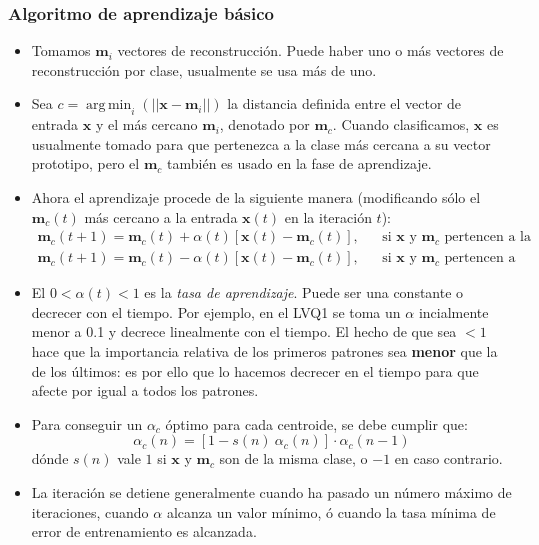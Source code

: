 \documentclass[10pt,a4paper]{article}
\DeclareMathOperator*{\argmin}{arg\,\min}
\begin{document}
\subsubsection{Algoritmo de aprendizaje básico}
\begin{itemize}
\item Tomamos $\mathbf{m}_i$ vectores de reconstrucción. Puede haber uno o más vectores  de reconstrucción por clase, usualmente se usa más de uno.
\item Sea $c = \argmin_i (||\mathbf{x} - \mathbf{m}_i||)$ la distancia definida entre el vector de entrada $\mathbf{x}$ y el más cercano $\mathbf{m}_i$, denotado por $\mathbf{m}_c$. Cuando clasificamos, $\mathbf{x}$ es usualmente tomado para que pertenezca a la clase más cercana a su vector prototipo, pero el $\mathbf{m}_c$ también es usado en la fase de aprendizaje.
\item Ahora el aprendizaje procede de la siguiente manera (modificando sólo el $\mathbf{m}_c(t)$ más cercano a la entrada $\mathbf{x}(t)$ en la iteración $t$):
\begin{align*}
\mathbf{m}_c(t+1) = \mathbf{m}_c(t) + \alpha(t)[\mathbf{x}(t) - \mathbf{m}_c(t)], && \text{si $\mathbf{x}$ y $\mathbf{m}_c$ pertencen a la misma clase,} \\
\mathbf{m}_c(t+1) = \mathbf{m}_c(t) - \alpha(t)[\mathbf{x}(t) - \mathbf{m}_c(t)], && \text{si $\mathbf{x}$ y $\mathbf{m}_c$ pertencen a distintas clases.} 
\end{align*}
\item El $0<\alpha(t)<1$ es la \textit{tasa de aprendizaje}. Puede ser una constante o decrecer con el tiempo. Por ejemplo, en el LVQ1 se toma un $\alpha$ incialmente menor a 0.1 y decrece linealmente con el tiempo. El hecho de que sea  $<1$ hace que la importancia relativa de los primeros patrones sea \textbf{menor} que la de los últimos: es por ello que lo hacemos decrecer en el tiempo para que afecte por igual a todos los patrones.
\item Para conseguir un $\alpha_c$ óptimo para cada centroide, se debe cumplir que:
\[\alpha_c (n) = [1 - s(n)\: \alpha_c(n)] \cdot \alpha_c(n-1)\]
dónde $s(n)$ vale $1$ si $\mathbf{x}$ y $\mathbf{m}_c$ son de la misma clase, o $-1$ en caso contrario.
\item La iteración se detiene generalmente cuando ha pasado un número máximo de iteraciones, cuando $\alpha$ alcanza un valor mínimo, ó cuando la tasa mínima de error de entrenamiento es alcanzada.
\end{itemize}
\end{document}
